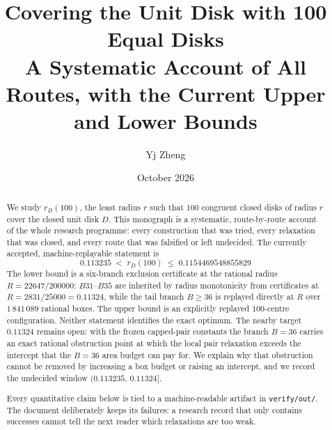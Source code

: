 \documentclass[11pt]{article}
\title{\bf Covering the Unit Disk with 100 Equal Disks\\[2mm]
\large A Systematic Account of All Routes, with the Current Upper and Lower Bounds}
\author{Yj Zheng}
\date{October 2026}
\theoremstyle{definition}
\theoremstyle{remark}
\newcommand{\rD}{r_{D}}
\begin{document}
\maketitle


\begin{abstract}
\noindent
We study $r_{D}(100)$, the least radius $r$ such that $100$ congruent closed disks of radius $r$
cover the closed unit disk $D$. This monograph is a systematic, route-by-route account of the
whole research programme: every construction that was tried, every relaxation that was closed,
and every route that was falsified or left undecided. The currently accepted, machine-replayable
statement is
\[
\boxed{\;0.113235\;<\;\rD(100)\;\le\;0.1154469548855829\;}
\]
The lower bound is a six-branch exclusion certificate at the rational radius
$R=22647/200000$: $B31$--$B35$ are inherited by radius monotonicity from certificates at
$R=2831/25000=0.11324$, while the tail branch $B\ge 36$ is replayed directly at $R$ over
$1\,841\,089$ rational boxes. The upper bound is an explicitly replayed $100$-centre
configuration. Neither statement identifies the exact optimum. The nearby target
$0.11324$ remains open: with the frozen capped-pair constants the branch $B=36$ carries an
exact rational obstruction point at which the local pair relaxation exceeds the intercept that
the $B=36$ area budget can pay for. We explain why that obstruction cannot be removed by
increasing a box budget or raising an intercept, and we record the undecided window
$(0.113235,\,0.11324]$.

Every quantitative claim below is tied to a machine-readable artifact in \texttt{verify/out/}.
The document deliberately keeps its failures: a research record that only contains successes
cannot tell the next reader which relaxations are too weak.
\end{abstract}

\tableofcontents













\end{document}
